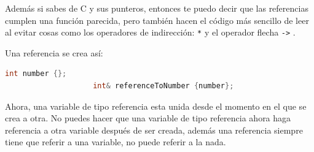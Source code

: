 \documentclass[12pt, fleqn]{report}                             %
\theoremstyle{break}                                            %
\newcommand{\textCode}[1]  { \texttt{#1} }                      %
\begin{document}
                Además si sabes de C y sus punteros, entonces te puedo decir que las referencias
                cumplen una función parecida, pero también hacen el código más sencillo de leer
                al evitar cosas como los operadores de indirección: \textCode{*} y el operador flecha
                \textCode{->}.

                Una referencia se crea así:
                \begin{lstlisting}[language=C++, gobble=20]
                    int number {};
                    int& referenceToNumber {number};
                \end{lstlisting}

                Ahora, una variable de tipo referencia esta unida desde el momento en el que se crea a otra.
                No puedes hacer que una variable de tipo referencia ahora haga referencia a otra variable después
                de ser creada, además una referencia siempre tiene que referir a una variable, no puede referir a
                la nada.

                \clearpage
\end{document}
